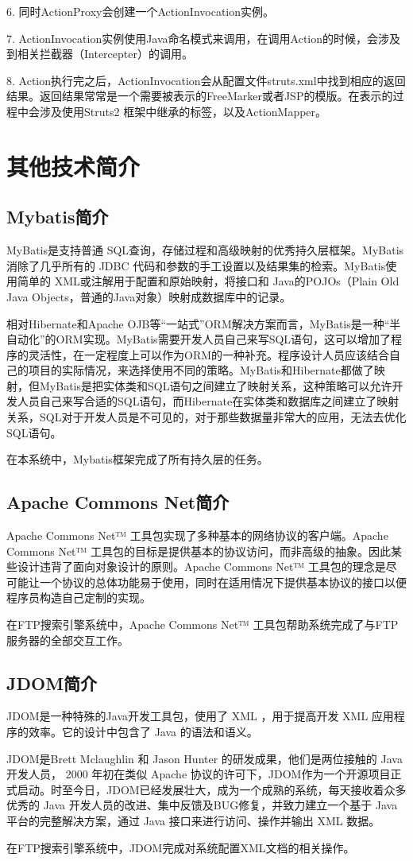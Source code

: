 6. 同时ActionProxy会创建一个ActionInvocation实例。 

7. ActionInvocation实例使用Java命名模式来调用，在调用Action的时候，会涉及到相关拦截器（Intercepter）的调用。
 
8. Action执行完之后，ActionInvocation会从配置文件struts.xml中找到相应的返回结果。返回结果常常是一个需要被表示的FreeMarker或者JSP的模版。在表示的过程中会涉及使用Struts2 框架中继承的标签，以及ActionMapper。


\section{其他技术简介}
\subsection{Mybatis简介}
MyBatis是支持普通 SQL查询，存储过程和高级映射的优秀持久层框架。My\-Batis消除了几乎所有的 JDBC 代码和参数的手工设置以及结果集的检索。My\-Batis使用简单的 XML或注解用于配置和原始映射，将接口和 Java的POJOs（Plain Old Java Objects，普通的Java对象）映射成数据库中的记录。

相对Hibernate和Apache OJB等“一站式”ORM解决方案而言，MyBatis是一种“半自动化”的ORM实现。MyBatis需要开发人员自己来写SQL语句，这可以增加了程序的灵活性，在一定程度上可以作为ORM的一种补充。程序设计人员应该结合自己的项目的实际情况，来选择使用不同的策略。MyBatis和Hibernate都做了映射，但MyBatis是把实体类和SQL语句之间建立了映射关系，这种策略可以允许开发人员自己来写合适的SQL语句，而Hibernate在实体类和数据库之间建立了映射关系，SQL对于开发人员是不可见的，对于那些数据量非常大的应用，无法去优化SQL语句。

在本系统中，Mybatis框架完成了所有持久层的任务。
\subsection{Apache Commons Net简介}
Apache Commons Net™ 工具包实现了多种基本的网络协议的客户端。Apache Commons Net™ 工具包的目标是提供基本的协议访问，而非高级的抽象。因此某些设计违背了面向对象设计的原则。Apache Commons Net™ 工具包的理念是尽可能让一个协议的总体功能易于使用，同时在适用情况下提供基本协议的接口以便程序员构造自己定制的实现。

在FTP搜索引擎系统中，Apache Commons Net™ 工具包帮助系统完成了与FTP
服务器的全部交互工作。
\subsection{JDOM简介}
JDOM是一种特殊的Java开发工具包，使用了 XML ，用于提高开发 XML 应用程序的效率。它的设计中包含了 Java 的语法和语义。

JDOM是Brett Mclaughlin 和 Jason Hunter 的研发成果，他们是两位接触的 Java 开发人员， 2000 年初在类似 Apache 协议的许可下，JDOM作为一个开源项目正式启动。时至今日，JDOM已经发展壮大，成为一个成熟的系统，每天接收着众多优秀的 Java 开发人员的改进、集中反馈及BUG修复，并致力建立一个基于 Java 平台的完整解决方案，通过 Java 接口来进行访问、操作并输出 XML 数据。

在FTP搜索引擎系统中，JDOM完成对系统配置XML文档的相关操作。

